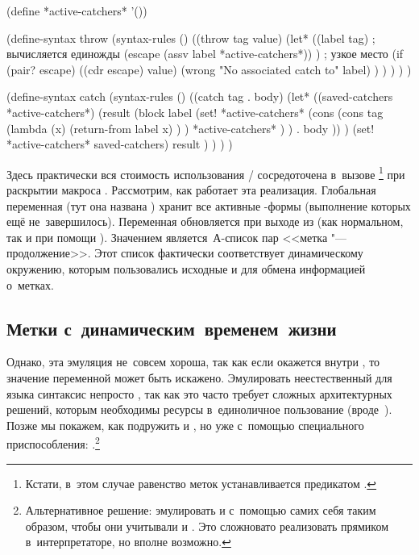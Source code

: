 \begin{code:lisp}
(define *active-catchers* '())

(define-syntax throw
  (syntax-rules ()
    ((throw tag value)
     (let* ((label tag)   ; вычисляется единожды
            (escape (assv label *active-catchers*)) ) ; узкое место
       (if (pair? escape)
           ((cdr escape) value)
           (wrong "No associated catch to" label) ) ) ) ) )

(define-syntax catch
  (syntax-rules ()
    ((catch tag . body)
     (let* ((saved-catchers *active-catchers*)
            (result (block label
                      (set! *active-catchers*
                            (cons (cons tag
                                        (lambda (x)
                                          (return-from label x) ) )
                                  *active-catchers* ) )
                      . body )) )
      (set! *active-catchers* saved-catchers)
      result ) ) ) )
\end{code:lisp}

Здесь практически вся стоимость использования \slash{}
сосредоточена в~вызове \footnote{Кстати, в~этом случае равенство меток
устанавливается предикатом .} при раскрытии макроса .
Рассмотрим, как работает эта реализация. Глобальная переменная (тут она названа
) хранит все активные -формы (выполнение которых
ещё не~завершилось). Переменная обновляется при выходе из  (как
нормальном, так и при помощи ). Значением 
является~А-список пар <<метка "--- продолжение>>. Этот список фактически
соответствует динамическому окружению, которым пользовались исходные 
и  для обмена информацией о~метках.


\subsection{Метки с~динамическим~временем~жизни}%
\label{escape/forms/ssect:dynamic}

Однако, эта эмуляция не~совсем хороша, так как если  окажется внутри
, то значение переменной  может быть искажено.
Эмулировать неестественный для языка синтаксис непросто \cite{fel90,bak92c}, так
как это часто требует сложных архитектурных решений, которым необходимы ресурсы
в~единоличное пользование (вроде~). Позже мы покажем, как
подружить  и , но уже с~помощью специального приспособления:
.\footnote*{Альтернативное решение: эмулировать 
и  с~помощью самих себя таким образом, чтобы они учитывали
 и . Это сложновато реализовать прямиком в~интерпретаторе,
но вполне возможно.}

